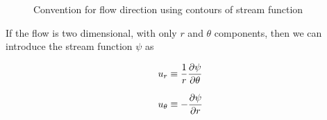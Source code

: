 \begin{figure}[h]
\begin{center}
\end{center}
\caption{Convention for flow direction using contours of stream function}
\label{psiflowconvention}
\end{figure}

If the flow is two dimensional, with only $r$ and $\theta$ components, then we can introduce the stream function $\psi$ as 

\begin{equation}
u_r \equiv {1 \over r} {\partial \psi \over \partial \theta}
\end{equation}

\begin{equation}
u_\theta \equiv - {\partial \psi \over \partial r}
\end{equation}


